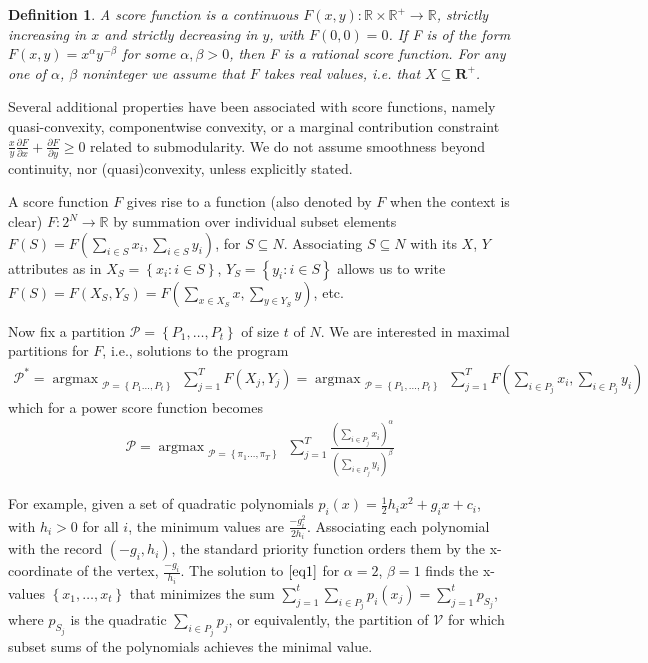 \documentclass{article}
\newtheorem{definition}{Definition}
\theoremstyle{case}
\DeclareMathOperator*{\argmax}{argmax} %
\begin{document}
\begin{definition}
A score function is a continuous $F(x, y)\colon \mathbb{R} \times \mathbb{R}^{+} \to \mathbb{R}$, strictly increasing in $x$ and strictly decreasing in $y$, with $F\left( 0,0\right) = 0$. If F is of the form $F(x,y) = x^\alpha y^{-\beta}$ for some $\alpha, \beta > 0$, then F is a rational score function. For any one of $\alpha$, $\beta$ noninteger we assume that $F$ takes real values, i.e. that $X \subseteq \mathbf{R}^+$.
\end{definition}

Several additional properties have been associated with score functions, namely quasi-convexity, componentwise convexity, or a marginal contribution constraint $\frac{x}{y} \frac{\partial F}{\partial x} + \frac{\partial F}{\partial y} \geq 0$ related to submodularity. We do not assume smoothness beyond continuity, nor (quasi)convexity, unless explicitly stated.

A score function $F$ gives rise to a function (also denoted by $F$ when the context is clear) $F \colon 2^N \rightarrow \mathbb{R}$ by summation over individual subset elements $F(S) = F(\sum_{i \in S} x_i, \sum_{i \in S} y_i)$, for $S \subseteq N$. Associating $S \subseteq N$ with its $X$, $Y$ attributes as in $X_S = \left\lbrace x_i \colon i \in S\right\rbrace$, $Y_S = \left\lbrace y_i \colon i \in S\right\rbrace$ allows us to write $F(S) = F(X_S, Y_S) = F(\sum_{x \in X_S}x, \sum_{y \in Y_S}y)$, etc.

Now fix a partition $\mathcal{P} = \left\lbrace P_1, \dots, P_t\right\rbrace$ of size $t$ of $N$. We are interested in maximal partitions for $F$, i.e., solutions to the program
\begin{align} \label{eq0}
\mathcal{P}^{*} = \argmax_{\substack{\mathcal{P} = \left\lbrace P_1 \dots, P_t\right\rbrace}} {\sum\limits_{j=1}^{T}F\left( X_j, Y_j\right)} = \argmax_{\substack{\mathcal{P} = \left\lbrace P_1, \dots, P_t\right\rbrace}} {\sum\limits_{j=1}^{T}F( \sum_{i \in P_j}x_i, \sum_{i \in P_j}y_i)}
\end{align}
which for a power score function becomes
\begin{align} \label{eq1}
\mathcal{P} = \argmax_{\substack{\mathcal{P} = \left\lbrace \pi_1 \dots, \pi_T\right\rbrace}}\sum_{j=1}^{T}\frac{(\sum_{i \in P_j}x_i)^\alpha}{(\sum_{i \in P_j}y_i)^\beta}
\end{align}

\vspace{4pt}

For example, given a set of quadratic polynomials $p_i(x) = \frac{1}{2}h_ix^2 + g_ix + c_i$, with $h_i >0$ for all $i$, the minimum values are $\frac{-g_i^2}{2h_i}$. Associating each polynomial with the record $(-g_i, h_i)$, the standard priority function orders them by the x-coordinate of the vertex, $\frac{-g_i}{h_i}$. The solution to $\ref{eq1}$ for $\alpha = 2$, $\beta = 1$ finds the x-values $\left\lbrace x_1, \dots, x_t\right\rbrace$ that minimizes the sum $\sum_{j=1}^t \sum_{i \in P_j} p_i\left( x_j\right) = \sum_{j=1}^t p_{S_j}$, where $p_{S_j}$ is the quadratic $\sum_{i \in P_j} p_j$, or equivalently, the partition of $\mathcal{V}$ for which subset sums of the polynomials achieves the minimal value.
\end{document}
